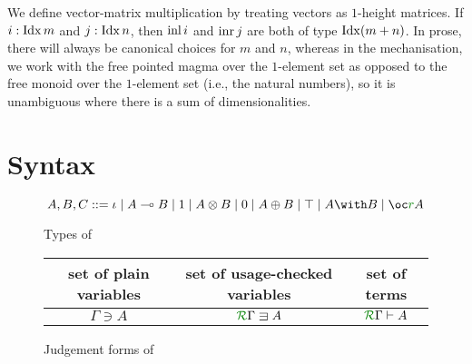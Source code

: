 \documentclass[submission,copyright,creativecommons]{eptcs}
\begin{document}
We define vector-matrix multiplication by treating vectors
as $1$-height matrices.
If $i : \operatorname{Idx} m$ and $j : \operatorname{Idx} n$, then $\operatorname{inl} i$ and $\operatorname{inr} j$ are both of type
$\operatorname{Idx}(m + n)$.
In prose, there will always be canonical choices for $m$ and $n$, whereas in the
mechanisation, we work with the free pointed magma over the $1$-element set as
opposed to the free monoid over the $1$-element set (i.e., the natural numbers),
so it is unambiguous where there is a sum of dimensionalities.

\section{Syntax}\label{sec:syntax}

\begin{figure}
  \begin{displaymath}
    A,B,C ::= \base \mid \fun A B \mid \tensorOne \mid \tensor A B
    \mid \sumTZero \mid \sumT A B \mid \withTOne \mid \withT A B \mid \excl{r} A
  \end{displaymath}
  \caption{Types of \name{}}
  \label{fig:types}
\end{figure}

\begin{figure}
  \centering
  \begin{tabular}{c|c|c}
    set of plain variables & set of usage-checked variables & set of terms
    \\\hline
    $\Gamma \ni A$ & $\ctx\Gamma R \lvar A$ & $\ctx\Gamma R \vdash A$
  \end{tabular}
  \caption{Judgement forms of \name{}}
  \label{fig:judgements}
\end{figure}
\end{document}
